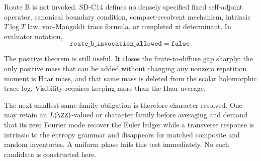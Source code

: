 Route B is not invoked.  SD-C14 defines no densely specified fixed
self-adjoint operator, canonical boundary condition, compact-resolvent
mechanism, intrinsic $T\log T$ law, von-Mangoldt trace formula, or completed
xi determinant.  In evaluator notation,
\[
 \mathtt{route\_b\_invocation\_allowed=false}.             \tag{6.2}
\]

The positive theorem is still useful.  It closes the finite-to-diffuse gap
sharply: the only positive mass that can be added without changing any
nonzero repetition moment is Haar mass, and that same mass is deleted from
the scalar holomorphic trace-log.  Visibility requires keeping more than the
Haar average.

The next smallest same-family obligation is therefore character-resolved.
One may retain an $L(\ZZ)$-valued or character family before averaging and
demand that its zero Fourier mode recover the Euler ledger while a transverse
response is intrinsic to the entropy grammar and disappears for matched
composite and random inventories.  A uniform phase fails this test
immediately.  No such candidate is constructed here.
